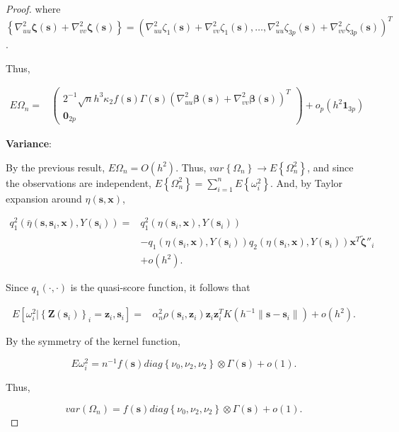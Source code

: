 \documentclass[12pt,english,authoryear, review]{article}\usepackage[]{graphicx}\usepackage[]{color}
\theoremstyle{plain}
\theoremstyle{plain}
\begin{document}
\begin{proof}
where $\left\{ \nabla_{uu}^{2}\bm{\zeta}\left(\bm{s}\right)+\nabla_{vv}^{2}\bm{\zeta}\left(\bm{s}\right)\right\} =\left(\nabla_{uu}^{2}\zeta_{1}\left(\bm{s}\right)+\nabla_{vv}^{2}\zeta_{1}\left(\bm{s}\right),\dots,\nabla_{uu}^{2}\zeta_{3p}\left(\bm{s}\right)+\nabla_{vv}^{2}\zeta_{3p}\left(\bm{s}\right)\right)^{T}$.

Thus,

\begin{align*}
E\Omega_{n}= & \left(\begin{array}{c}
2^{-1}\sqrt{n}h^{3}\kappa_{2}f\left(\bm{s}\right)\Gamma\left(\bm{s}\right)\left(\nabla_{uu}^{2}\bm{\beta}\left(\bm{s}\right)+\nabla_{vv}^{2}\bm{\beta}\left(\bm{s}\right)\right)^{T}\\
\bm{0}_{2p}
\end{array}\right)+o_{p}\left(h^{2}\bm{1}_{3p}\right)
\end{align*}


\textbf{Variance}:

By the previous result, $E\Omega_{n}=O\left(h^{2}\right)$. Thus,
$var\left\{ \Omega_{n}\right\} \to E\left\{ \Omega_{n}^{2}\right\} $,
and since the observations are independent, $E\left\{ \Omega_{n}^{2}\right\} =\sum_{i=1}^{n}E\left\{ \omega_{i}^{2}\right\} $.
And, by Taylor expansion around $\eta\left(\bm{s},\bm{x}\right)$, 

\begin{align*}
q_{1}^{2}\left(\bar{\eta}\left(\bm{s},\bm{s}_{i},\bm{x}\right),Y\left(\bm{s}_{i}\right)\right)= & q_{1}^{2}\left(\eta\left(\bm{s}_{i},\bm{x}\right),Y\left(\bm{s}_{i}\right)\right)\\
 & -q_{1}\left(\eta\left(\bm{s}_{i},\bm{x}\right),Y\left(\bm{s}_{i}\right)\right)q_{2}\left(\eta\left(\bm{s}_{i},\bm{x}\right),Y\left(\bm{s}_{i}\right)\right)\bm{x}^{T}\tilde{\bm{\zeta}}''_{i}\\
 & +o\left(h^{2}\right).
\end{align*}


Since $q_{1}\left(\cdot,\cdot\right)$ is the quasi-score function,
it follows that 

\begin{align*}
E\left[\omega_{i}^{2}|\left\{ \bm{Z}\left(\bm{s}_{i}\right)\right\} _{i}=\bm{z}_{i},\bm{s}_{i}\right]= & \alpha_{n}^{2}\rho\left(\bm{s}_{i},\bm{z}_{i}\right)\bm{z}_{i}\bm{z}_{i}^{T}K\left(h^{-1}\|\bm{s}-\bm{s}_{i}\|\right)+o\left(h^{2}\right).
\end{align*}


By the symmetry of the kernel function,

\[
E\omega_{i}^{2}=n^{-1}f\left(\bm{s}\right)diag\left\{ \nu_{0},\nu_{2},\nu_{2}\right\} \otimes\Gamma\left(\bm{s}\right)+o\left(1\right).
\]


Thus, 

\[
var\left(\Omega_{n}\right)=f\left(\bm{s}\right)diag\left\{ \nu_{0},\nu_{2},\nu_{2}\right\} \otimes\Gamma\left(\bm{s}\right)+o\left(1\right).
\]

\end{proof}
\end{document}
